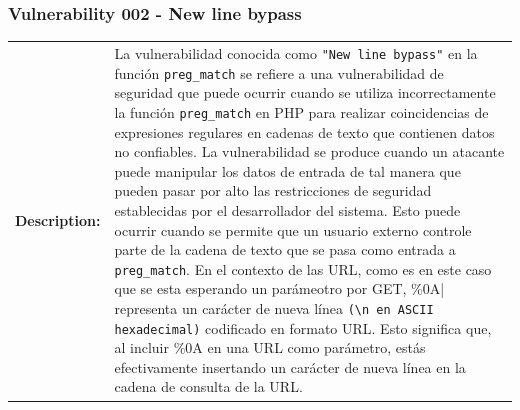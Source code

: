 \documentclass[a4paper]{article} %
\begin{document}
    \clearpage

    \subsubsection{\textbf{Vulnerability 002 - New line bypass}}
    \begin{table}[htbp]
        \begin{tabularx}{\textwidth}{|c|X|}
            \hline
            \cellcolor{lightgray}\textbf{Description:} & 
            {
                
                La vulnerabilidad conocida como \verb|"New line bypass"| en la función \verb|preg_match| se refiere a una vulnerabilidad de seguridad que puede ocurrir cuando se utiliza incorrectamente la función \verb|preg_match| en PHP para realizar coincidencias de expresiones regulares en cadenas de texto que contienen datos no confiables.
                \newline\newline
                La vulnerabilidad se produce cuando un atacante puede manipular los datos de entrada de tal manera que pueden pasar por alto las restricciones de seguridad establecidas por el desarrollador del sistema. Esto puede ocurrir cuando se permite que un usuario externo controle parte de la cadena de texto que se pasa como entrada a \verb|preg_match|.
                \newline\newline
                En el contexto de las URL, como es en este caso que se esta esperando un parámeotro por GET, \%0A| representa un carácter de nueva línea \verb|(\n en ASCII hexadecimal)| codificado en formato URL. Esto significa que, al incluir \%0A en una URL como parámetro, estás efectivamente insertando un carácter de nueva línea en la cadena de consulta de la URL.

}
\end{tabularx}
\end{table}
\end{document}
